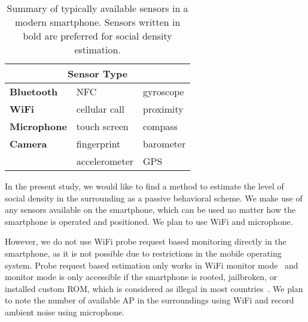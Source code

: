 


\begin{table}[h]
\centering
\caption[Summary of typical smartphone sensors]
{Summary of typically available sensors in a modern smartphone. Sensors written in bold are preferred for social density estimation.}
\label{tab:smartphone-sensor-summary}
\begin{tabular}{lll}
\toprule
\multicolumn{3}{c}{Sensor Type} \\ \midrule
\textbf{Bluetooth}   & \ac{NFC}                    & gyroscope \\
\textbf{WiFi}        & cellular call               & proximity \\
\textbf{Microphone}  & touch screen                & compass \\
\textbf{Camera}      & fingerprint                 & barometer \\
                     & accelerometer               & \ac{GPS} \\
\bottomrule
\end{tabular}
\end{table}

In the present study, we would like to find a method to estimate the level of social density in the surrounding as a passive behavioral scheme. We make use of any sensors available on the smartphone, which can be used no matter how the smartphone is operated and positioned. We plan to use WiFi and microphone.

However, we do not use WiFi probe request based monitoring directly in the smartphone, as it is not possible due to restrictions in the mobile operating system. Probe request based estimation only works in WiFi monitor mode~\cite{thesis052,thesis079} and monitor mode is only accessible if the smartphone is rooted, jailbroken, or installed custom \ac{ROM}, which is considered as illegal in most countries~\cite{rootjailbreak}. We plan to note the number of available \ac{AP} in the surroundings using WiFi and record ambient noise using microphone.

